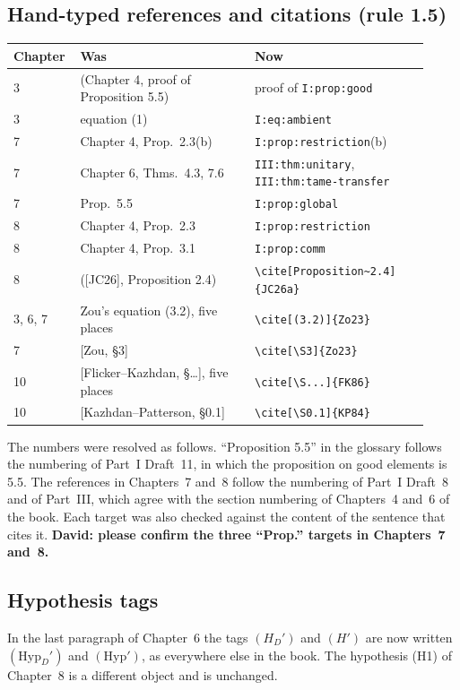 \documentclass[12pt,letterpaper]{article}
\begin{document}
\subsection{Hand-typed references and citations (rule 1.5)}
\begin{center}\small
\begin{longtable}{@{}p{0.12\linewidth}p{0.40\linewidth}p{0.40\linewidth}@{}}\toprule
Chapter & Was & Now\\\midrule\endhead
3 & (Chapter 4, proof of Proposition 5.5) & proof of \texttt{I:prop:good}\\
3 & equation (1) & \texttt{I:eq:ambient}\\
7 & Chapter 4, Prop.\ 2.3(b) & \texttt{I:prop:restriction}(b)\\
7 & Chapter 6, Thms.\ 4.3, 7.6 & \texttt{III:thm:unitary}, \texttt{III:thm:tame-transfer}\\
7 & Prop.\ 5.5 & \texttt{I:prop:global}\\
8 & Chapter 4, Prop.\ 2.3 & \texttt{I:prop:restriction}\\
8 & Chapter 4, Prop.\ 3.1 & \texttt{I:prop:comm}\\
8 & ([JC26], Proposition 2.4) & \verb|\cite[Proposition~2.4]{JC26a}|\\
3, 6, 7 & Zou's equation (3.2), five places & \verb|\cite[(3.2)]{Zo23}|\\
7 & {[Zou, \S3]} & \verb|\cite[\S3]{Zo23}|\\
10 & {[Flicker--Kazhdan, \S\ldots]}, five places & \verb|\cite[\S...]{FK86}|\\
10 & {[Kazhdan--Patterson, \S0.1]} & \verb|\cite[\S0.1]{KP84}|\\
\bottomrule
\end{longtable}
\end{center}
The numbers were resolved as follows. ``Proposition 5.5'' in the glossary follows the numbering of Part~I Draft~11, in which the proposition on good elements is 5.5. The references in Chapters~7 and~8 follow the numbering of Part~I Draft~8 and of Part~III, which agree with the section numbering of Chapters~4 and~6 of the book. Each target was also checked against the content of the sentence that cites it. \textbf{David: please confirm the three ``Prop.'' targets in Chapters~7 and~8.}

\subsection{Hypothesis tags}
In the last paragraph of Chapter~6 the tags $(H_D')$ and $(H')$ are now written $(\mathrm{Hyp}_D')$ and $(\mathrm{Hyp}')$, as everywhere else in the book. The hypothesis (H1) of Chapter~8 is a different object and is unchanged.
\end{document}
